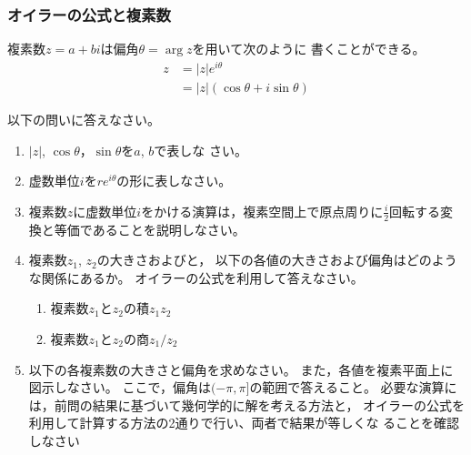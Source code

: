 \documentclass[twocolumn,11pt]{jarticle}
\begin{document}
\subsubsection{オイラーの公式と複素数\label{sec:Euler-complex}}

複素数$z=a+bi$は偏角$\theta=\arg z$を用いて次のように
書くことができる。
\begin{align*}
  z&=|z|e^{i\theta}\\
  &=|z|(\cos\theta+i\sin\theta)
\end{align*}

\nquestion 以下の問いに答えなさい。
\begin{enumerate}
\item $|z|$, $\cos\theta$，$\sin\theta$を$a$, $b$で表しな
  さい。
\item 虚数単位$i$を$re^{i\theta}$の形に表しなさい。
\item 複素数$z$に虚数単位$i$をかける演算は，複素空間上で原点周りに$\frac{i}{2}$回転する変換と等価であることを説明しなさい。
\item 複素数$z_1$, $z_2$の大きさおよびと，
  以下の各値の大きさおよび偏角はどのような関係にあるか。
  オイラーの公式を利用して答えなさい。
  \begin{enumerate}
  \item 複素数$z_1$と$z_2$の積$z_1z_2$
  \item 複素数$z_1$と$z_2$の商$z_1/z_2$
  \end{enumerate}
\item 以下の各複素数の大きさと偏角を求めなさい。
  また，各値を複素平面上に図示しなさい。
  ここで，偏角は$(-\pi,\pi]$の範囲で答えること。
  必要な演算には，前問の結果に基づいて幾何学的に解を考える方法と，
  オイラーの公式を利用して計算する方法の2通りで行い、両者で結果が等しくな
  ることを確認しなさい
\end{enumerate}
\end{document}
